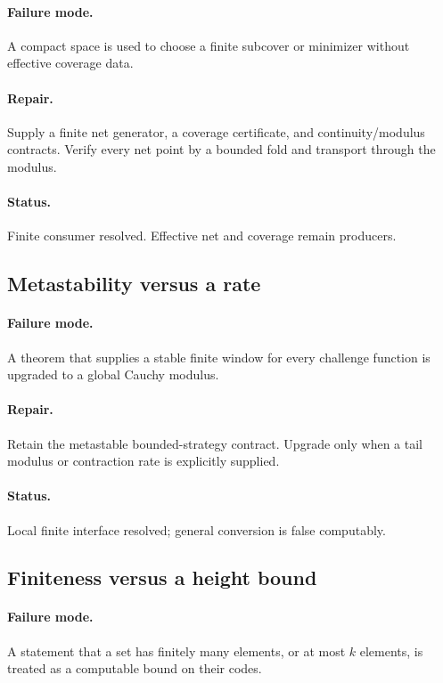 \paragraph{Failure mode.}
A compact space is used to choose a finite subcover or minimizer without effective coverage data.

\paragraph{Repair.}
Supply a finite net generator, a coverage certificate, and continuity/modulus contracts.  Verify every net point by a bounded fold and transport through the modulus.

\paragraph{Status.}
Finite consumer resolved.  Effective net and coverage remain producers.

\subsection{Metastability versus a rate}

\paragraph{Failure mode.}
A theorem that supplies a stable finite window for every challenge function is upgraded to a global Cauchy modulus.

\paragraph{Repair.}
Retain the metastable bounded-strategy contract.  Upgrade only when a tail modulus or contraction rate is explicitly supplied.

\paragraph{Status.}
Local finite interface resolved; general conversion is false computably.

\subsection{Finiteness versus a height bound}

\paragraph{Failure mode.}
A statement that a set has finitely many elements, or at most \(k\) elements, is treated as a computable bound on their codes.

